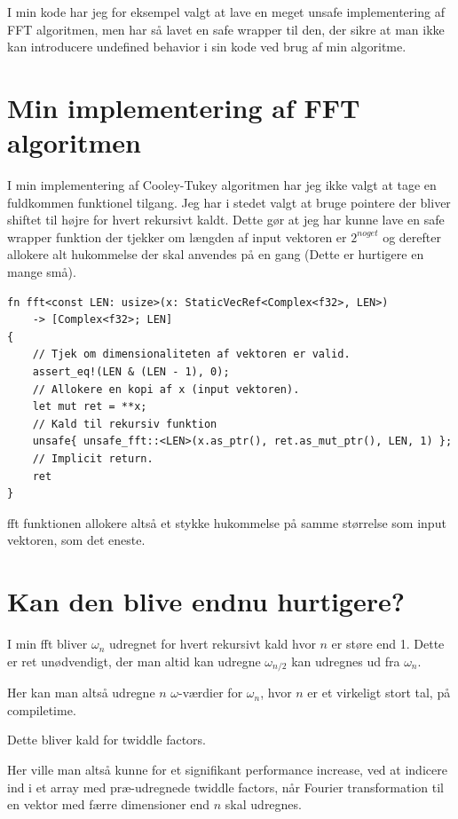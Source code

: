 \documentclass[11pt,a4paper]{article}
\begin{document}
I min kode har jeg for eksempel valgt at lave en meget unsafe implementering af FFT algoritmen,
men har så lavet en safe wrapper til den, der sikre at man ikke kan introducere undefined behavior i sin kode ved brug af min algoritme.

\section{Min implementering af FFT algoritmen}
\label{sec:orgc1b0518}
I min implementering af Cooley-Tukey algoritmen har jeg ikke valgt at tage en fuldkommen funktionel tilgang.
Jeg har i stedet valgt at bruge pointere der bliver shiftet til højre for hvert rekursivt kaldt.
Dette gør at jeg har kunne lave en safe wrapper funktion der tjekker om længden af input vektoren er \(2^{noget}\)
og derefter allokere alt hukommelse der skal anvendes på en gang (Dette er hurtigere en mange små).

\begin{verbatim}
fn fft<const LEN: usize>(x: StaticVecRef<Complex<f32>, LEN>)
    -> [Complex<f32>; LEN]
{
    // Tjek om dimensionaliteten af vektoren er valid.
    assert_eq!(LEN & (LEN - 1), 0);
    // Allokere en kopi af x (input vektoren).
    let mut ret = **x;
    // Kald til rekursiv funktion
    unsafe{ unsafe_fft::<LEN>(x.as_ptr(), ret.as_mut_ptr(), LEN, 1) };
    // Implicit return.
    ret
}
\end{verbatim}

fft funktionen allokere altså et stykke hukommelse på samme størrelse som input vektoren, som det eneste.

\section{Kan den blive endnu hurtigere?}
\label{sec:orgb8127de}
I min fft bliver \(\omega_n\) udregnet for hvert rekursivt kald hvor \(n\) er støre end 1.
Dette er ret unødvendigt, der man altid kan udregne \(\omega_{n/2}\) kan udregnes ud fra \(\omega_n\).

Her kan man altså udregne \(n\) \(\omega\)-værdier for \(\omega_n\), hvor \(n\) er et virkeligt stort tal,
på compiletime.

Dette bliver kald for twiddle factors.

Her ville man altså kunne for et signifikant performance increase,
ved at indicere ind i et array med præ-udregnede twiddle factors, når Fourier transformation til en vektor med færre dimensioner end \(n\) skal udregnes.
\end{document}
